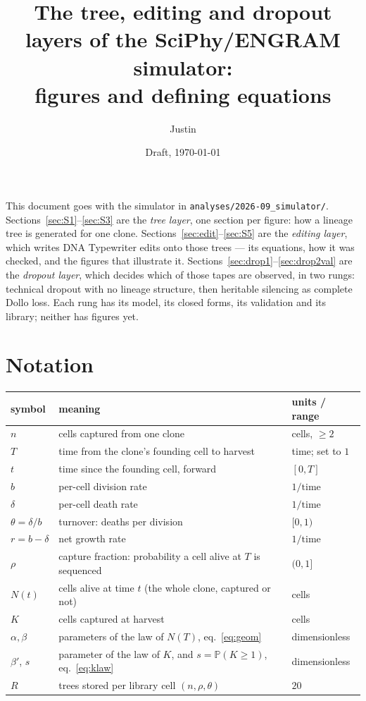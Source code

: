 \documentclass[11pt]{article}
\title{The tree, editing and dropout layers of the SciPhy/ENGRAM simulator:\\ figures and defining equations}
\author{Justin}  %
\date{Draft, \today}
\newcommand{\bdrate}{b}          %
\newcommand{\dthrate}{\delta}    %
\newcommand{\turn}{\theta}       %
\newcommand{\net}{r}             %
\newcommand{\capt}{\rho}         %
\newcommand{\Prob}{\mathbb{P}}
\begin{document}
\maketitle

\noindent This document goes with the simulator in
\texttt{analyses/2026-09\_simulator/}. Sections~\ref{sec:S1}--\ref{sec:S3} are the \emph{tree layer},
one section per figure: how a lineage tree is generated for one clone.
Sections~\ref{sec:edit}--\ref{sec:S5} are the \emph{editing layer}, which writes DNA Typewriter edits
onto those trees --- its equations, how it was checked, and the figures that illustrate it.
Sections~\ref{sec:drop1}--\ref{sec:drop2val} are the \emph{dropout layer}, which decides which of
those tapes are observed, in two rungs: technical dropout with no lineage structure, then heritable
silencing as complete Dollo loss. Each rung has its model, its closed forms, its validation and its
library; neither has figures yet.

\section*{Notation}

\begin{center}\small
\begin{tabular}{@{}lll@{}}
\toprule
symbol & meaning & units / range \\
\midrule
$n$ & cells captured from one clone & cells, $\ge 2$ \\
$T$ & time from the clone's founding cell to harvest & time; set to $1$ \\
$t$ & time since the founding cell, forward & $[0,T]$ \\
$\bdrate$ & per-cell division rate & $1/\text{time}$ \\
$\dthrate$ & per-cell death rate & $1/\text{time}$ \\
$\turn=\dthrate/\bdrate$ & turnover: deaths per division & $[0,1)$ \\
$\net=\bdrate-\dthrate$ & net growth rate & $1/\text{time}$ \\
$\capt$ & capture fraction: probability a cell alive at $T$ is sequenced & $(0,1]$ \\
$N(t)$ & cells alive at time $t$ (the whole clone, captured or not) & cells \\
$K$ & cells captured at harvest & cells \\
$\alpha,\beta$ & parameters of the law of $N(T)$, eq.~\eqref{eq:geom} & dimensionless \\
$\beta'$, $s$ & parameter of the law of $K$, and $s=\Prob(K\ge1)$, eq.~\eqref{eq:klaw} & dimensionless \\
$R$ & trees stored per library cell $(n,\capt,\turn)$ & $20$ \\
\bottomrule
\end{tabular}
\end{center}
\end{document}
